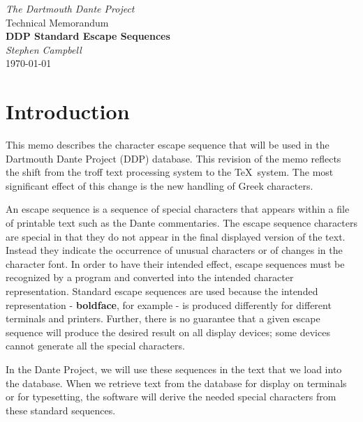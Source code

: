 

\begin{titlepage}
	\begin{center}
		\vspace{1in}
		{\LARGE \it The Dartmouth Dante Project} \\
		\vspace{.3in}
		{\large Technical Memorandum} \\
		\vspace{2in}
		{\large \bf DDP Standard Escape Sequences} \\
		\vspace{.2in}
		{\it Stephen Campbell} \\
		\vfill
		\today
	\end{center}
\end{titlepage}

\pagestyle{headings}
\section{Introduction}
This memo describes the character escape sequence that will be used in
the Dartmouth Dante Project (DDP) database.
This revision of the memo reflects the shift from the troff text
processing system to the \TeX\ system.
The most significant effect of this change is the new handling of
Greek characters.

An escape sequence is a sequence of special characters that appears within a
file of printable text such as the Dante commentaries.
The escape sequence characters are special in that they do not appear in
the final displayed version of the text.  Instead they indicate the
occurrence of unusual characters or of changes in the character font.
In order to have their intended effect, escape sequences must be recognized
by a program and converted into the intended character representation.
Standard escape sequences are used because the intended representation -
{\bf boldface}, for example -
is produced differently for different terminals and printers.
Further, there is no guarantee that a given escape sequence will produce
the desired result on all display devices;
some devices cannot generate all the special characters.

In the Dante Project, 
we will use these sequences in the text that we load into the database.
When we retrieve text from the database for display
on terminals or for typesetting, the software will derive
the needed special characters from these standard sequences.

